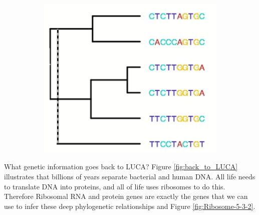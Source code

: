 \documentclass[]{article}
\begin{document}
\begin{figure}[H]
\begin{subfigure}[b]{0.3\textwidth}
	\end{subfigure}
	\begin{subfigure}[b]{0.3\textwidth}
		\includegraphics[width=\textwidth]{LongBranchAttraction2}
	\end{subfigure}
\end{figure}

 What genetic information goes back to LUCA? Figure \ref{fig:back_to_LUCA} illustrates that billions of years separate bacterial and human DNA. All life needs to translate DNA into proteins, and all of life uses ribosomes to do this. Therefore Ribosomal RNA and protein genes are exactly the genes that we can use to infer these deep phylogenetic relationships\cite{quast2012silva} and Figure \ref{fig:Ribosome-5-3-2}.
 
\end{document}
